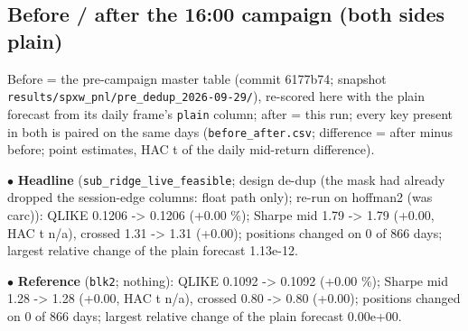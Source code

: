 \documentclass[10pt]{article}
\begin{document}
\subsection*{Before /\allowbreak{} after the 16:00 campaign (both sides plain)}
Before = the pre-campaign master table (commit 6177b74; snapshot \texttt{results/\allowbreak{}spxw\_pnl/\allowbreak{}pre\_dedup\_2026-09-29/\allowbreak{}}), re-scored here with the plain forecast from its daily frame's \texttt{plain} column; after = this run; every key present in both is paired on the same days (\texttt{before\_after.csv}; difference = after minus before; point estimates, HAC t of the daily mid-return difference).\par
$\bullet$ \textbf{Headline} (\texttt{sub\_ridge\_live\_feasible}; design de-dup (the mask had already dropped the session-edge columns: float path only); re-run on hoffman2 (was carc)): QLIKE 0.1206 -> 0.1206 (+0.00 \%); Sharpe mid 1.79 -> 1.79 (+0.00, HAC t n/\allowbreak{}a), crossed 1.31 -> 1.31 (+0.00); positions changed on 0 of 866 days; largest relative change of the plain forecast 1.13e-12.\par
$\bullet$ \textbf{Reference} (\texttt{blk2}; nothing): QLIKE 0.1092 -> 0.1092 (+0.00 \%); Sharpe mid 1.28 -> 1.28 (+0.00, HAC t n/\allowbreak{}a), crossed 0.80 -> 0.80 (+0.00); positions changed on 0 of 866 days; largest relative change of the plain forecast 0.00e+00.\par
\begingroup\scriptsize\setlength{\tabcolsep}{2.5pt}
\end{document}
